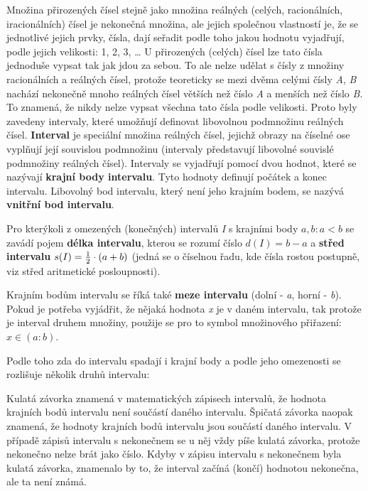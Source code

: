 Množina přirozených čísel stejně jako množina reálných (celých, racionálních, iracionálních) čísel je nekonečná množina, ale jejich společnou vlastností je, že se jednotlivé jejich prvky, čísla, dají seřadit podle toho jakou hodnotu vyjadřují, podle jejich velikosti: 1, 2, 3, … U přirozených (celých) čísel lze tato čísla jednoduše vypsat tak jak jdou za sebou. To ale nelze udělat s čísly z množiny racionálních a reálných čísel, protože teoreticky se mezi dvěma celými čísly {\it A}, {\it B} nachází nekonečně mnoho reálných čísel větších než číslo {\it A}  a menších než číslo {\it B}. To znamená, že nikdy nelze vypsat všechna tato čísla podle velikosti. Proto byly zavedeny intervaly, které umožňují definovat libovolnou podmnožinu reálných čísel. {\bf Interval} je speciální množina reálných čísel, jejichž obrazy na číselné ose vyplňují její souvislou podmnožinu (intervaly představují libovolné souvislé podmnožiny reálných čísel). Intervaly se vyjadřují pomocí dvou hodnot, které se nazývají {\bf krajní body intervalu}. Tyto hodnoty definují počátek a konec intervalu. Libovolný bod intervalu, který není jeho krajním bodem, se nazývá {\bf vnitřní bod intervalu}.

Pro kterýkoli z omezených (konečných) intervalů {\it I} s krajními body $a, b: a < b$ se zavádí pojem {\bf délka intervalu}, kterou se rozumí číslo $ d(I) = b - a $ a {\bf střed intervalu} $ s(I) = {1 \over 2}\cdot (a + b) $ (jedná se o číselnou řadu, kde čísla rostou postupně, viz střed aritmetické posloupnosti).

Krajním bodům intervalu se říká také {\bf meze intervalu} (dolní - {\it a}, horní - {\it b}). Pokud je potřeba vyjádřit, že nějaká hodnota {\it x} je v daném intervalu, tak protože je interval druhem množiny, použije se pro to symbol množinového přiřazení: $ x \in (a:b) $.


Podle toho zda do intervalu spadají i krajní body a podle jeho omezenosti se rozlišuje několik druhů intervalu:

\vskip 4mm
\vskip 4mm

Kulatá závorka znamená v matematických zápisech intervalů, že hodnota krajních bodů intervalu není součástí daného intervalu. Špičatá závorka naopak znamená, že hodnoty krajních bodů intervalu jsou součástí daného intervalu. V případě zápisů intervalu s nekonečnem se u něj vždy píše kulatá závorka, protože nekonečno nelze brát jako číslo. Kdyby v zápisu intervalu s nekonečnem byla kulatá závorka, znamenalo by to, že interval začíná (končí) hodnotou nekonečna, ale ta není známá.

